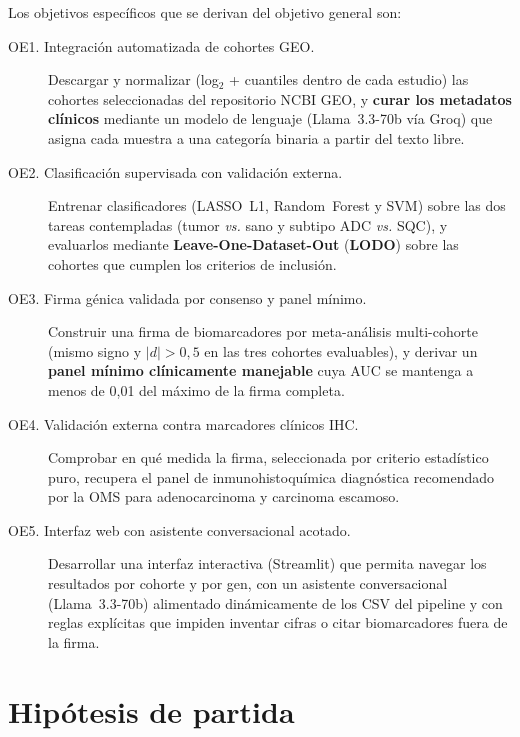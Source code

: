 Los objetivos específicos que se derivan del objetivo general son:

\begingroup\sloppy
\begin{description}
  \item[OE1. Integración automatizada de cohortes GEO.] Descargar y
  normalizar (log$_2$ + cuantiles dentro de cada estudio) las cohortes
  seleccionadas del repositorio NCBI GEO, y \textbf{curar los metadatos
  clínicos} mediante un modelo de lenguaje (Llama~3.3-70b vía Groq) que
  asigna cada muestra a una categoría binaria a partir del texto libre.

  \item[OE2. Clasificación supervisada con validación externa.]
  Entrenar clasificadores (LASSO~L1, Random~Forest y SVM) sobre las dos
  tareas contempladas (tumor \emph{vs.} sano y subtipo ADC \emph{vs.}
  SQC), y evaluarlos mediante \textbf{Leave-One-Dataset\--Out}
  (\textbf{LODO}) sobre las cohortes que cumplen los criterios de
  inclusión.

  \item[OE3. Firma génica validada por consenso y panel mínimo.]
  Construir una firma de biomarcadores por meta-análisis multi-cohorte
  (mismo signo y $|d|>0{,}5$ en las tres cohortes evaluables), y
  derivar un \textbf{panel mínimo clínicamente manejable} cuya AUC se
  mantenga a menos de 0,01 del máximo de la firma completa.

  \item[OE4. Validación externa contra marcadores clínicos IHC.]
  Comprobar en qué medida la firma, seleccionada por criterio
  estadístico puro, recupera el panel de inmunohistoquímica
  diagnóstica recomendado por la OMS para adenocarcinoma y carcinoma
  escamoso.

  \item[OE5. Interfaz web con asistente conversacional acotado.]
  Desarrollar una interfaz interactiva (Streamlit) que permita
  navegar los resultados por cohorte y por gen, con un asistente
  conversacional (Llama~3.3-70b) alimentado dinámicamente de los CSV
  del pipeline y con reglas explícitas que impiden inventar cifras o
  citar biomarcadores fuera de la firma.
\end{description}
\endgroup

\section*{Hipótesis de partida}
\label{sec:hipotesis}
{}

